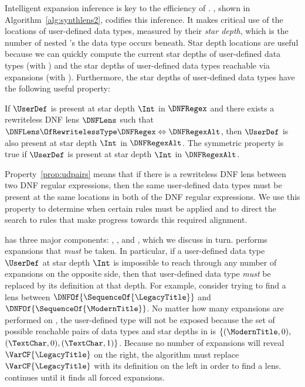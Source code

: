 \documentclass[sigplan,acmsmall]{acmart}
\begin{document}
Intelligent expansion inference is key to the efficiency of \Optician{}.
\Expand{}, shown in Algorithm~\ref{alg:synthlens2}, codifies this inference.
It makes critical use of the locations of user-defined data types, measured 
by their \emph{star depth}, which is the number of nested \Star{}'s the data type occurs beneath.
Star depth locations are useful because we can quickly compute the
current star depths of user-defined data types (with \GetCurrentSet{}) and the
star depths of user-defined data types reachable via expansions
(with \GetTransitiveSet{}).
Furthermore, the star depths of user-defined data types have the following useful property:

\begin{property}
\label{prop:udpairs}
  If $\UserDef$ is present at star depth $\Int$ in $\DNFRegex$ and there
  exists a rewriteless
  DNF lens $\DNFLens$ such that $\DNFLens \OfRewritelessType \DNFRegex
  \Leftrightarrow \DNFRegexAlt$, then $\UserDef$ is also present at star depth
  $\Int$ in $\DNFRegexAlt$.  The symmetric property is true if $\UserDef$ is
  present at star depth $\Int$ in $\DNFRegexAlt$.
\end{property}

Property~\ref{prop:udpairs} means that if there is a rewriteless DNF lens
between two DNF regular expressions, then the same user-defined
data types must be present at the same locations in both of the DNF regular
expressions. We use this
property to determine when certain rules must be applied and to direct the search
to rules that make progress towards this required alignment.

\Expand{} has three major components: \ExpandRequired{}, \FixProblemElts{}, and
\ExpandOnce{}, which we discuss in turn.
\ExpandRequired{} performs expansions that \emph{must} be taken.  In particular,
if a user-defined data type $\UserDef$ at star depth $\Int$ is impossible 
to reach through any number of expansions on the opposite side, then that 
user-defined data type \emph{must} be replaced by its definition at
that depth.
For example, 
consider trying to find a lens between $\DNFOf{\SequenceOf{\LegacyTitle}}$ and
$\DNFOf{\SequenceOf{\ModernTitle}}$.
No matter how many expansions are performed on
, the user-defined type 
will not be exposed 
because the set of possible reachable pairs of
data types and star depths in  is $\{(\ModernTitle,0),
$ $(\TextChar,0),(\TextChar,1)\}$.  Because no number of expansions will reveal
$\VarCF{\LegacyTitle}$ on the right, 
the algorithm must replace $\VarCF{\LegacyTitle}$ with its definition
on the left in order to find a lens.
\ExpandRequired{} continues until it finds all forced expansions.
\end{document}
